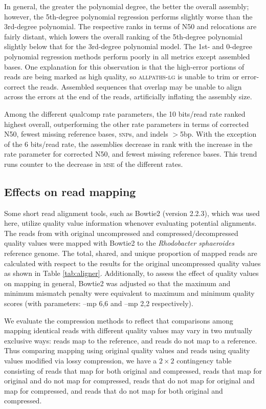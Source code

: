 \documentclass[fleqn,10pt,lineno]{wlpeerj} %
\begin{document}
In general, the greater the polynomial degree, the better the overall
assembly; however, the 5th-degree polynomial regression performs
slightly worse than the 3rd-degree polynomial. The respective ranks in
terms of N50 and relocations are fairly distant, which lowers the
overall ranking of the 5th-degree polynomial slightly below that for
the 3rd-degree polynomial model. The 1st- and 0-degree polynomial
regression methods perform poorly in all metrics except assembled
bases. One explanation for this observation is that the high-error
portions of reads are being marked as high quality, so
\textsc{allpaths-lg} is unable to trim or error-correct the
reads. Assembled sequences that overlap may be unable to align across
the errors at the end of the reads, artificially inflating the
assembly size.

Among the different \textsc{q}ual\textsc{c}omp rate parameters, the 10
bits/read rate ranked highest overall, outperforming the other rate
parameters in terms of corrected N50, fewest missing reference bases,
\textsc{snp}s, and indels $>$5bp. With the exception of the 6
bits/read rate, the assemblies decrease in rank with the increase in
the rate parameter for corrected N50, and fewest missing reference
bases. This trend runs counter to the decrease in \textsc{mse} of the
different rates.

\subsection*{Effects on read mapping}

Some short read alignment tools, such as Bowtie2 (version 2.2.3),
which was used here, utilize quality value information whenover
evaluating potential alignments. The reads from with original
uncompressed and compressed/decompressed quality values were mapped
with Bowtie2 to the \textit{Rhodobacter sphaeroides} reference
genome. The total, shared, and unique proportion of mapped reads are
calculated with respect to the results for the original uncompressed
quality values as shown in Table \ref{tab:aligner}. Additionally, to
assess the effect of quality values on mapping in general, Bowtie2 was
adjusted so that the maximum and minimum mismatch penalty were
equivalent to maximum and minimum quality scores (with parameters:
--mp 6,6 and --mp 2,2 respectively).

We evaluate the compression methods to reflect that comparisons among
mapping identical reads with different quality values may vary in two
mutually exclusive ways: reads map to the reference, and reads do not
map to a reference. Thus comparing mapping using original quality
values and reads using quality values modified via lossy compression,
we have a $2 \times 2$ contingency table consisting of reads that map
for both original and compressed, reads that map for original and do
not map for compressed, reads that do not map for original and map for
compressed, and reads that do not map for both original and
compressed.
\end{document}
